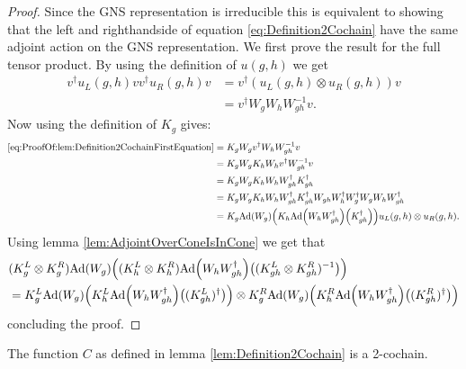 \documentclass[11pt,a4paper,twoside]{article}
\numberwithin{equation}{section}
\begin{document}
\begin{proof}
	Since the GNS representation is irreducible this is equivalent to showing that the left and righthandside of equation \eqref{eq:Definition2Cochain} have the same adjoint action on the GNS representation. We first prove the result for the full tensor product. By using the definition of $u(g,h)$ we get
	\begin{align}\label{eq:ProofOf:lem:Definition2CochainFirstEquation}
		v^\dagger u_L(g,h)v v^\dagger u_R(g,h) v&=v^\dagger (u_L(g,h)\otimes u_R(g,h)) v\\
		&=v^\dagger W_g W_h W_{gh}^{-1}v.
	\end{align}
	Now using the definition of $K_g$ gives:
	\begin{align}
		\eqref{eq:ProofOf:lem:Definition2CochainFirstEquation}&=K_gW_g v^\dagger W_h W_{gh}^{-1}v\\
		&=K_gW_g K_h W_h v^\dagger W_{gh}^{-1}v\\
		&=K_gW_g K_h W_h W_{gh}^\dagger K_{gh}^\dagger\\
		&=K_gW_g K_h W_h W_{gh}^\dagger K_{gh}^\dagger W_{gh}W_h^\dagger W_g^\dagger W_gW_hW_{gh}^\dagger\\
		&=K_g\Ad{W_g}\left(K_h\Ad{W_hW_{gh}^\dagger}\left(K_{gh}^\dagger\right)\right)u_L(g,h)\otimes u_
			R(g,h).
	\end{align}
	Using lemma \ref{lem:AdjointOverConeIsInCone} we get that
	\begin{align}
		&(K_g^L\otimes K_g^R)\Ad{W_g}\left((K_h^L\otimes K_h^R)\Ad{W_hW_{gh}^\dagger}\left((K_{gh}^L\otimes K_{gh}^R)^{-1}\right)\right)\\
		&=K_g^L\Ad{W_g}\left(K_h^L\Ad{W_hW_{gh}^\dagger}\left((K_{gh}^L)^\dagger\right)\right)\otimes K_g^R\Ad{W_g}\left(K_h^R\Ad{W_hW_{gh}^\dagger}\left((K_{gh}^R)^\dagger\right)\right)
	\end{align}
	concluding the proof.
\end{proof}
\begin{lemma}
	The function $C$ as defined in lemma \ref{lem:Definition2Cochain} is a 2-cochain.
\end{lemma}
\end{document}

